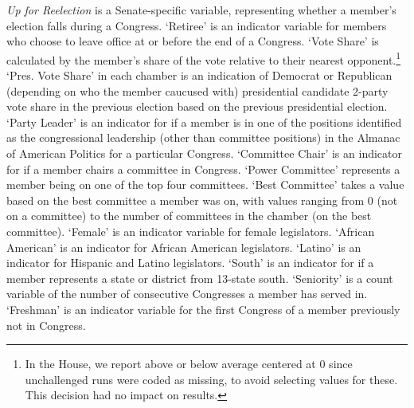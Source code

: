 \documentclass[12pt]{article}
\begin{document}
\textit{Up for Reelection} is a Senate-specific variable, representing whether a member's election falls during a Congress. `Retiree' is an indicator variable for members who choose to leave office at or before the end of a Congress. `Vote Share' is calculated by the member's share of the vote relative to their nearest opponent.\footnote{\doublespacing\normalsize In the House, we report above or below average centered at 0 since unchallenged runs were coded as missing, to avoid selecting values for these. This decision had no impact on results.}  `Pres. Vote Share' in each chamber is an indication of Democrat or Republican (depending on who the member caucused with) presidential candidate 2-party vote share in the previous election based on the previous presidential election.  `Party Leader' is an indicator for if a member is in one of the positions identified as the congressional leadership (other than committee positions) in the Almanac of American Politics for a particular Congress. `Committee Chair' is an indicator for if a member chairs a committee in Congress. `Power Committee' represents a member being on one of the top four committees.  `Best Committee' takes a value based on the best committee a member was on, with values ranging from 0 (not on a committee) to the number of committees in the chamber (on the best committee). `Female' is an indicator variable for female legislators. `African American' is an indicator for African American legislators. `Latino' is an indicator for Hispanic and Latino legislators. `South' is an indicator for if a member represents a state or district from 13-state south. `Seniority' is a count variable of the number of consecutive Congresses a member has served in. `Freshman' is an indicator variable for the first Congress of a member previously not in Congress.
\end{document}
